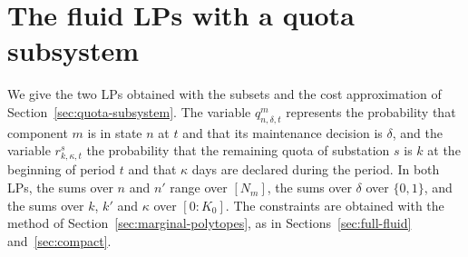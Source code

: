 \documentclass{article}
\begin{document}
 
 

\section{The fluid LPs with a quota subsystem}
\label{app:light}

We give the two LPs obtained with the subsets and the cost approximation of Section~\ref{sec:quota-subsystem}. The
variable $q^m_{n,\delta,t}$ represents the probability that component $m$ is in state $n$ at $t$ and that its maintenance
decision is $\delta$, and the variable $r^s_{k,\kappa,t}$ the probability that the remaining quota of substation $s$ is $k$ at the beginning of period $t$ and that $\kappa$ days are declared during the period. In both LPs, the sums over
$n$ and $n'$ range over $[N_m]$, the sums over $\delta$ over $\{0,1\}$, and the sums over $k$, $k'$ and $\kappa$ over
$[0:K_0]$. The constraints are obtained with the method of Section~\ref{sec:marginal-polytopes}, as in
Sections~\ref{sec:full-fluid} and~\ref{sec:compact}.
\end{document}
